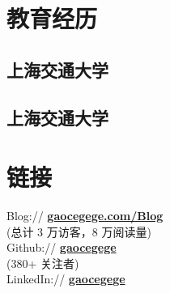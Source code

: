 \documentclass[]{deedy-resume-openfont}
\begin{document}
%
%
\lastupdated

%
%

%
%

\begin{minipage}[t]{0.25\textwidth} 


\section{教育经历} 
\sectionsep

\subsection{上海交通大学}
\sectionsep

\subsection{上海交通大学}
\sectionsep


\section{链接}
\sectionsep
Blog://  \href{http://gaocegege.com/Blog}{\bf gaocegege.com/Blog} \\
(总计 3 万访客，8 万阅读量) \\    
Github:// \href{https://github.com/gaocegege}{\bf gaocegege} \\
(380+ 关注者) \\
LinkedIn://  \href{https://www.linkedin.com/in/gaocegege}{\bf gaocegege} \\



\end{minipage}
\end{document}
